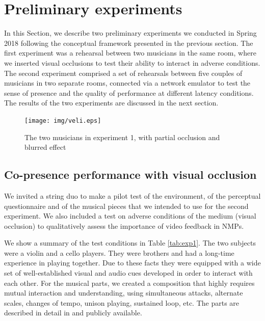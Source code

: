 

\section{Preliminary experiments}\label{sec:setup}
In this Section, we describe two preliminary experiments we conducted in Spring 2018 following the conceptual framework presented in the previous section. The first experiment was a rehearsal between two musicians in the same room, where we inserted visual occlusions to test their ability to interact in adverse conditions. The second experiment comprised a set of rehearsals between five couples of musicians in two separate rooms, connected via a network emulator to test the sense of presence and the quality of performance at different latency conditions. The results of the two experiments are discussed in the next section.


\begin{figure}[t]
	\centering
	\texttt{[image: img/veli.eps]}
	\caption{The two musicians in experiment 1, with partial occlusion and blurred effect}
	\label{fig:veli}
\end{figure}

\subsection{Co-presence performance with visual occlusion}\label{subsec:blur}
We invited a string duo to make a pilot test of the environment, of the perceptual questionnaire and of the musical pieces that we intended to use for the second experiment. We also included a test on adverse conditions of the medium (visual occlusion) to qualitatively assess the importance of video feedback in NMPs.

We show a summary of the test conditions in Table \ref{tab:exp1}. The two subjects were a violin and a cello players. They were brothers and had a long-time experience in playing together. Due to these facts they were equipped with a wide set of well-established visual and audio cues developed in order to interact with each other. For the musical parts, we created a composition that highly requires mutual interaction and understanding, using simultaneous attacks, alternate scales, changes of tempo, unison playing, sustained loop, etc. The parts are described in detail in \cite{CIM2018} and publicly available.%


